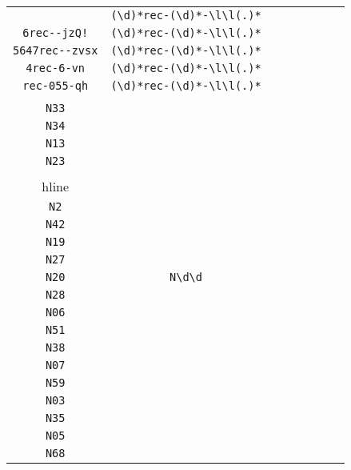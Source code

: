 \begin{longtable}{cccccccc}
\begin{tabular}{ll}
    \verb|5rec--jnE| & \verb|(\d)*rec-(\d)*-\l\l(.)*|\\
\verb|6rec--jzQ!| & \verb|(\d)*rec-(\d)*-\l\l(.)*|\\
\verb|5647rec--zvsx| & \verb|(\d)*rec-(\d)*-\l\l(.)*|\\
\verb|4rec-6-vn| & \verb|(\d)*rec-(\d)*-\l\l(.)*|\\
\verb|rec-055-qh| & \verb|(\d)*rec-(\d)*-\l\l(.)*|
\end{tabular}
\\\midrule 
\begin{tabular}{l}
    \verb|N22|\\
\verb|N33|\\
\verb|N34|\\
\verb|N13|\\
\verb|N23|\\
\\hline\\
\verb|N2|\\
\verb|N42|\\
\verb|N19|\\
\verb|N27|\\
\verb|N20|
\end{tabular}

&
\verb|N\d\d|
&

\begin{tabular}{l}
    \verb|N\d\d|\\
\verb|N28|\\
\verb|N06|\\
\verb|N51|\\
\verb|N38|\\
\verb|N07|
\end{tabular}

&

\begin{tabular}{l}
    \verb|N\d\d|\\
\verb|N59|\\
\verb|N03|\\
\verb|N35|\\
\verb|N05|\\
\verb|N68|
\end{tabular}

&


\end{longtable}
